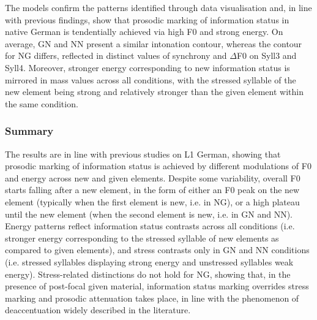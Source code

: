 \begin{styleStandard}
The models confirm the patterns identified through data visualisation and, in line with previous findings, show that prosodic marking of information status in native German is tendentially achieved via high F0 and strong energy. On average, GN and NN present a similar intonation contour, whereas the contour for NG differs, reflected in distinct values of synchrony and ${\Delta}$F0 on Syll3 and Syll4. Moreover, stronger energy corresponding to new information status is mirrored in mass values across all conditions, with the stressed syllable of the new element being strong and relatively stronger than the given element within the same condition.
\end{styleStandard}

\subsubsection{Summary}
\hypertarget{Toc191305907}{}\begin{styleStandard}
The results are in line with previous studies on L1 German, showing that prosodic marking of information status is achieved by different modulations of F0 and energy across new and given elements. Despite some variability, overall F0 starts falling after a new element, in the form of either an F0 peak on the new element (typically when the first element is new, i.e. in NG), or a high plateau until the new element (when the second element is new, i.e. in GN and NN). Energy patterns reflect information status contrasts across all conditions (i.e. stronger energy corresponding to the stressed syllable of new elements as compared to given elements), and stress contrasts only in GN and NN conditions (i.e. stressed syllables displaying strong energy and unstressed syllables weak energy). Stress-related distinctions do not hold for NG, showing that, in the presence of post-focal given material, information status marking overrides stress marking and prosodic attenuation takes place, in line with the phenomenon of deaccentuation widely described in the literature.
\end{styleStandard}

